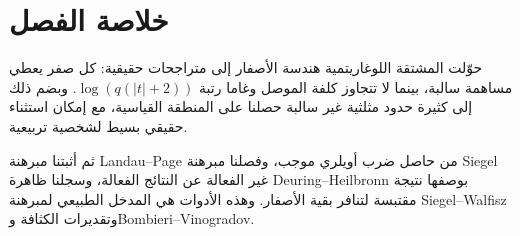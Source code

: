 \section{خلاصة الفصل}

حوّلت المشتقة اللوغاريتمية هندسة الأصفار إلى متراجحات حقيقية: كل صفر يعطي
مساهمة سالبة، بينما لا تتجاوز كلفة الموصل وغاما رتبة
\(\log(q(|t|+2))\). وبضم ذلك إلى كثيرة حدود مثلثية غير سالبة حصلنا على
المنطقة القياسية، مع إمكان استثناء حقيقي بسيط لشخصية تربيعية.

ثم أثبتنا مبرهنة Landau--Page من حاصل ضرب أويلري موجب، وفصلنا مبرهنة
Siegel غير الفعالة عن النتائج الفعالة، وسجلنا ظاهرة Deuring--Heilbronn
بوصفها نتيجة مقتبسة لتنافر بقية الأصفار. وهذه الأدوات هي المدخل الطبيعي
لمبرهنة Siegel--Walfisz وتقديرات الكثافة وBombieri--Vinogradov.